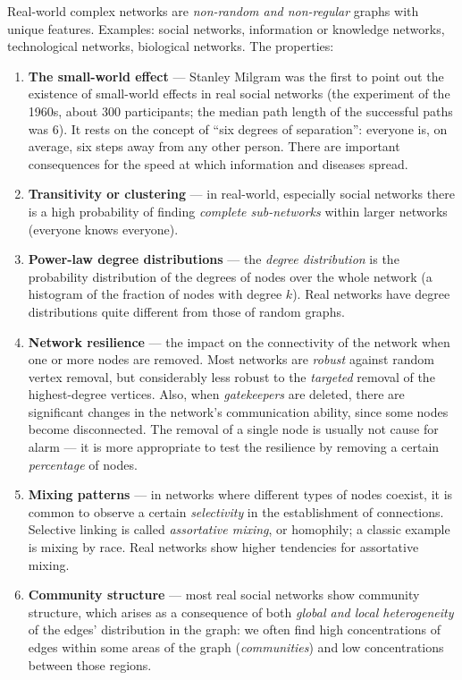 \documentclass[11pt,a4paper]{article}
\theoremstyle{definition}
\providecommand{\uv}[1]{``#1''}
\begin{document}
\begin{defbox}
Real-world complex networks are \emph{non-random and non-regular} graphs with unique features.
Examples: social networks, information or knowledge networks, technological networks, biological
networks. The properties:
\begin{enumerate}
\item \textbf{The small-world effect} --- Stanley Milgram was the first to point out the existence of
      small-world effects in real social networks (the experiment of the 1960s, about 300
      participants; the median path length of the successful paths was 6). It rests on the concept of
      \uv{six degrees of separation}: everyone is, on average, six steps away from any other person.
      There are important consequences for the speed at which information and diseases spread.
\item \textbf{Transitivity or clustering} --- in real-world, especially social networks there is a
      high probability of finding \emph{complete sub-networks} within larger networks (everyone knows
      everyone).
\item \textbf{Power-law degree distributions} --- the \emph{degree distribution} is the probability
      distribution of the degrees of nodes over the whole network (a histogram of the fraction of
      nodes with degree $k$). Real networks have degree distributions quite different from those of
      random graphs.
\item \textbf{Network resilience} --- the impact on the connectivity of the network when one or more
      nodes are removed. Most networks are \emph{robust} against random vertex removal, but
      considerably less robust to the \emph{targeted} removal of the highest-degree vertices. Also,
      when \emph{gatekeepers} are deleted, there are significant changes in the network's
      communication ability, since some nodes become disconnected. The removal of a single node is
      usually not cause for alarm --- it is more appropriate to test the resilience by removing a
      certain \emph{percentage} of nodes.
\item \textbf{Mixing patterns} --- in networks where different types of nodes coexist, it is common to
      observe a certain \emph{selectivity} in the establishment of connections. Selective linking is
      called \emph{assortative mixing}, or homophily; a classic example is mixing by race. Real
      networks show higher tendencies for assortative mixing.
\item \textbf{Community structure} --- most real social networks show community structure, which
      arises as a consequence of both \emph{global and local heterogeneity} of the edges'
      distribution in the graph: we often find high concentrations of edges within some areas of the
      graph (\emph{communities}) and low concentrations between those regions.
\end{enumerate}
\end{defbox}
\end{document}
